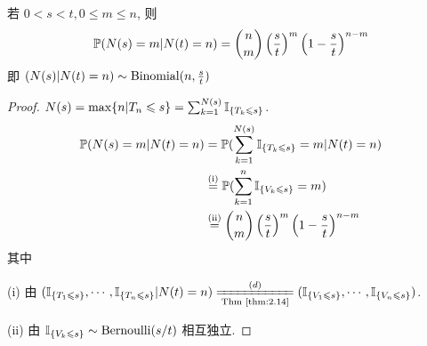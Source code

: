 \begin{theorem}
    若 $0<s<t,0\leq m\leq n$, 则
    \begin{equation}
        \mathbb{P}(N(s)=m|N(t)=n)=\binom{n}{m}\left(\frac{s}{t}\right)^m\left(1-\frac{s}{t}\right)^{n-m}
        \label{eq:p111-4}
    \end{equation}
    即 $(N(s)|N(t)=n)\sim \operatorname{Binomial}(n,\frac{s}{t})$
\end{theorem}

\begin{proof}
    $N(s)=\max\{n|T_n\leqslant s\}=\sum_{k=1}^{N(s)}\mathbb I_{\{T_k\leqslant s\}}$.
    \[
    \begin{aligned}
        \mathbb{P}(N(s)=m|N(t)=n) &=\mathbb{P}(\sum_{k=1}^{N(s)}\mathbb I_{\{T_k\leqslant s\}}=m|N(t)=n)\\
        &\overset{\text{(i)}}{=}\mathbb{P}(\sum_{k=1}^n\mathbb I_{\{V_k\leqslant s\}}=m)\\
        &\overset{\text{(ii)}}{=}\binom{n}{m}\left(\frac{s}{t}\right)^m\left(1-\frac{s}{t}\right)^{n-m}
    \end{aligned}
    \]
    其中 
    
    (i) 由 $(\II_{\{T_1\leq s\}}, \cdots,\II_{\{T_n\leq s\}}|N(t)=n)\xlongequal[\text{Thm \eqref{thm:2.14}}]{(d)}(\II_{\{V_1\leq s\}},\cdots,\II_{\{V_n\leq s\}})$. 
    
    (ii) 由 $\mathbb I_{\{V_k\leqslant s\}}\sim \operatorname{Bernoulli}(s/t)$ 相互独立.
\end{proof}
\newpage